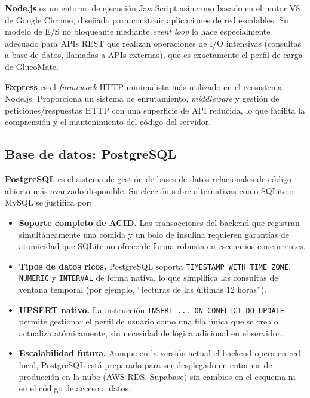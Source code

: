 \textbf{Node.js} \cite{nodejs2009} es un entorno de ejecución JavaScript asíncrono
basado en el motor V8 de Google Chrome, diseñado para construir aplicaciones de red
escalables. Su modelo de E/S no bloqueante mediante \textit{event loop} lo hace
especialmente adecuado para APIs REST que realizan operaciones de I/O intensivas
(consultas a base de datos, llamadas a APIs externas), que es exactamente el perfil
de carga de GlucoMate.

\textbf{Express} \cite{express2010} es el \textit{framework} HTTP minimalista más
utilizado en el ecosistema Node.js. Proporciona un sistema de enrutamiento, \textit{middleware}
y gestión de peticiones/respuestas HTTP con una superficie de API reducida, lo que facilita
la comprensión y el mantenimiento del código del servidor.

\subsection{Base de datos: PostgreSQL}
\label{subsec:herramienta-postgres}

\textbf{PostgreSQL} \cite{postgres1996} es el sistema de gestión de bases de datos
relacionales de código abierto más avanzado disponible. Su elección sobre alternativas
como SQLite o MySQL se justifica por:

\begin{itemize}
    \item \textbf{Soporte completo de ACID.} Las transacciones del backend que registran
          simultáneamente una comida y un bolo de insulina requieren garantías de
          atomicidad que SQLite no ofrece de forma robusta en escenarios concurrentes.
    \item \textbf{Tipos de datos ricos.} PostgreSQL soporta \texttt{TIMESTAMP WITH TIME
          ZONE}, \texttt{NUMERIC} y \texttt{INTERVAL} de forma nativa, lo que simplifica
          las consultas de ventana temporal (por ejemplo, ``lecturas de las últimas 12 horas'').
    \item \textbf{UPSERT nativo.} La instrucción \texttt{INSERT ... ON CONFLICT DO UPDATE}
          permite gestionar el perfil de usuario como una fila única que se crea o
          actualiza atómicamente, sin necesidad de lógica adicional en el servidor.
    \item \textbf{Escalabilidad futura.} Aunque en la versión actual el backend opera en
          red local, PostgreSQL está preparado para ser desplegado en entornos de
          producción en la nube (AWS RDS, Supabase) sin cambios en el esquema ni en el
          código de acceso a datos.
\end{itemize}

